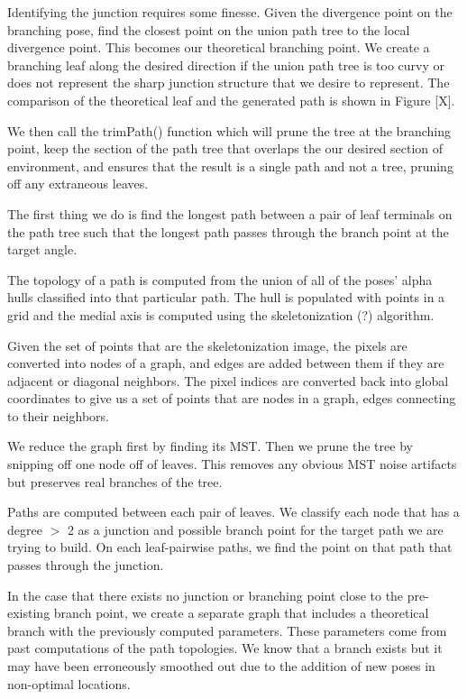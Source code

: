 Identifying the junction requires some finesse. Given the divergence point on the branching pose, find the closest point on the union path tree to the local divergence point. This becomes our theoretical branching point. We create a branching leaf along the desired direction if the union path tree is too curvy or does not represent the sharp junction structure that we desire to represent. The comparison of the theoretical leaf and the generated path is shown in Figure [X].

We then call the trimPath() function which will prune the tree at the branching point, keep the section of the path tree that overlaps the our desired section of environment, and ensures that the result is a single path and not a tree, pruning off any extraneous leaves.

The first thing we do is find the longest path between a pair of leaf terminals on the path tree such that the longest path passes through the branch point at the target angle.

The topology of a path is computed from the union of all of the poses' alpha hulls classified into that particular path. The hull is populated with points in a grid and the medial axis is computed using the skeletonization (?) algorithm. 

Given the set of points that are the skeletonization image, the pixels are converted into nodes of a graph, and edges are added between them if they are adjacent or diagonal neighbors. The pixel indices are converted back into global coordinates to give us a set of points that are nodes in a graph, edges connecting to their neighbors.

We reduce the graph first by finding its MST. Then we prune the tree by snipping off one node off of leaves. This removes any obvious MST noise artifacts but preserves real branches of the tree.

Paths are computed between each pair of leaves. We classify each node that has a degree $>$ 2 as a junction and possible branch point for the target path we are trying to build. On each leaf-pairwise paths, we find the point on that path that passes through the junction.

In the case that there exists no junction or branching point close to the pre-existing branch point, we create a separate graph that includes a theoretical branch with the previously computed parameters. These parameters come from past computations of the path topologies. We know that a branch exists but it may have been erroneously smoothed out due to the addition of new poses in non-optimal locations.

